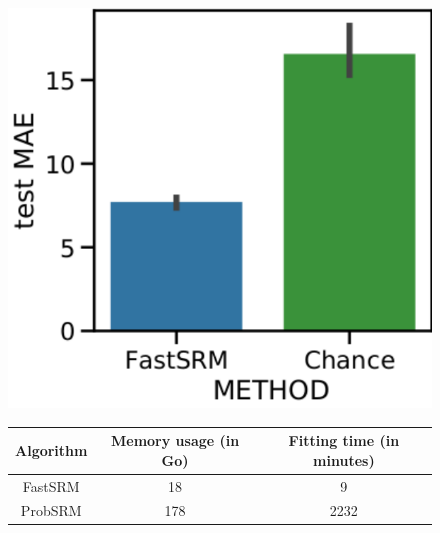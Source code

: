 \begin{figure}
\centering
\includegraphics[scale=0.44]{figures/srm/predict_age.pdf}

\begin{tabular}{|c|c|c|}
	\hline
	Algorithm & Memory usage (in Go) & Fitting time (in minutes) \\
	\hline
	FastSRM & 18 & 9 \\
	ProbSRM & 178 & 2232 \\
	\hline
\end{tabular}


\end{figure}
